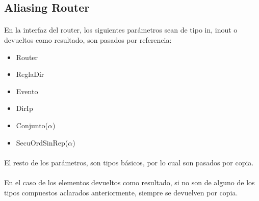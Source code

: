 \subsection*{Aliasing Router}

\paragraph{}
En la interfaz del router, los siguientes par\'ametros sean de tipo in, inout o devueltos como resultado, son pasados por referencia:
\begin{itemize}
 \item Router
 \item ReglaDir
 \item Evento
 \item DirIp 
 \item Conjunto($\alpha$)
 \item SecuOrdSinRep($\alpha$)
\end{itemize}

\paragraph{}
El resto de los par\'ametros, son tipos b\'asicos, por lo cual son pasados por copia.

\paragraph{}
En el caso de los elementos devueltos como resultado, si no son de alguno de los tipos compuestos aclarados anteriormente, siempre se devuelven por copia.
